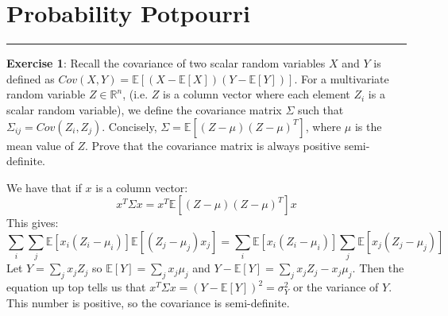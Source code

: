 \documentclass{article}
\begin{document}
\newpage
\section*{Probability Potpourri}
\hrule

\textbf{Exercise 1}: Recall the covariance of two scalar random variables $X$ and $Y$ is defined as $Cov(X, Y) = \mathbb{E}[(X - \mathbb{E}[X])(Y - \mathbb{E}[Y])]$. For a multivariate random variable $Z \in \mathbb{R}^{n}$, (i.e. $Z$ is a column vector where each element $Z_{i}$ is a scalar random variable), we define the covariance matrix $\Sigma$ such that $\Sigma_{ij} = Cov(Z_{i}, Z_{j})$. Concisely, $\Sigma = \mathbb{E}[(Z - \mu)(Z - \mu)^{T}]$, where $\mu$ is the mean value of $Z$. Prove that the covariance matrix is always positive semi-definite. 
    \begin{answer}
        We have that if $x$ is a column vector:
            \begin{equation*}
                x^{T} \Sigma x = x^{T}\mathbb{E}[(Z - \mu)(Z - \mu)^{T}]x
            \end{equation*}
        This gives:
            \begin{equation*}
                \sum_{i} \sum_{j} \mathbb{E}[x_{i} (Z_{i} - \mu_{i})]\mathbb{E}[(Z_{j} - \mu_{j}) x_{j}] = \sum_{i} \mathbb{E}[x_{i}(Z_{i} - \mu_{i})] \sum_{j} \mathbb{E}[x_{j}(Z_{j} - \mu_{j})]
            \end{equation*}
        Let $Y = \sum_{j} x_{j}Z_{j}$ so $\mathbb{E}[Y] = \sum_{j} x_{j}\mu_{j}$ and $Y - \mathbb{E}[Y] = \sum_{j} x_{j}Z_{j} - x_{j}\mu_{j}$. Then the equation up top tells us that $x^{T} \Sigma x = (Y - \mathbb{E}[Y])^{2} = \sigma_{Y}^{2}$ or the variance of $Y$. This number is positive, so the covariance is semi-definite.
    \end{answer}
\end{document}
